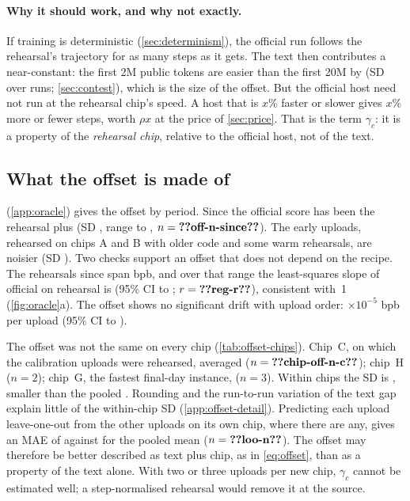 \paragraph{Why it should work, and why not exactly.} If training is deterministic (\cref{sec:determinism}), the
official run follows the rehearsal's trajectory for as many steps as it gets. The text then contributes a
near-constant: the first 2M public tokens are easier than the first 20M by  (SD  over
 runs; \cref{sec:contest}), which is the size of the offset. But the official host need not run at the rehearsal chip's
speed. A host that is $x\%$ faster or slower gives $x\%$ more or fewer steps, worth $\rho x$ at the price of
\cref{sec:price}. That is the term $\gamma_c$: it is a property of the \emph{rehearsal chip}, relative to the
official host, not of the text.

\subsection{What the offset is made of}

 (\cref{app:oracle}) gives the offset by period. Since  the official score has been the rehearsal plus
 (SD , range  to ,
$n=\val{off-n-since}$). The early uploads, rehearsed on chips A and B with older code and some warm rehearsals, are
noisier (SD ). Two checks support an offset that does not depend on the recipe. The rehearsals
since  span  bpb, and over that range the least-squares slope of official on
rehearsal is  (95\% CI  to ; $r=\val{reg-r}$), consistent with~1
(\cref{fig:oracle}a). The offset shows no significant drift with upload order: $\times10^{-5}$ bpb per
upload (95\% CI  to ).

The offset was not the same on every chip (\cref{tab:offset-chips}). Chip~C, on which the calibration uploads
were rehearsed, averaged  ($n=\val{chip-off-n-c}$); chip~H  ($n=2$); chip~G, the
fastest final-day instance,  ($n=3$). Within chips the SD is , smaller than the
pooled . Rounding and the run-to-run variation of the text gap explain little of the within-chip SD (\cref{app:offset-detail}). Predicting each upload
leave-one-out from the other uploads on its own chip, where there are any, gives an MAE of  against
 for the pooled mean ($n=\val{loo-n}$). The offset may therefore be better described as text plus
chip, as in \cref{eq:offset}, than as a property of the text alone. With two or three uploads per new chip,
$\gamma_c$ cannot be estimated well; a step-normalised rehearsal would remove it at the source.

